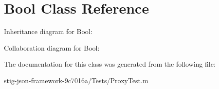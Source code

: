 \hypertarget{interface_bool}{
\section{\-Bool \-Class \-Reference}
\label{interface_bool}
}


\-Inheritance diagram for \-Bool\-:


\-Collaboration diagram for \-Bool\-:


\-The documentation for this class was generated from the following file\-:\begin{DoxyCompactItemize}
\item 
stig-\/json-\/framework-\/9c7016a/\-Tests/\-Proxy\-Test.\-m\end{DoxyCompactItemize}
